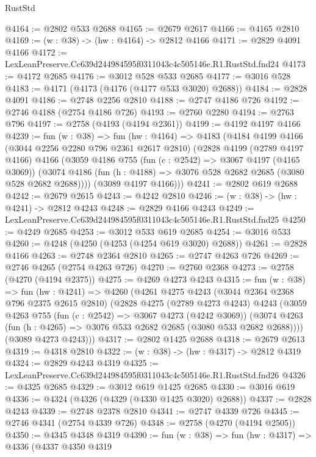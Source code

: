 \begin{lexlean}{RustStd}
\begin{coremodule}
@4164 := @2802 @533 @2688
@4165 := @2679 @2617
@4166 := @4165 @2810
@4169 := (w : @38) -> (hw : @4164) -> @2812 @4166
@4171 := @2829 @4091 @4166
@4172 := LexLeanPreserve.Cc639d244984595f0311043c4c505146e.R1.RustStd.fnd24
@4173 := @4172 @2685
@4176 := @3012 @528 @533 @2685
@4177 := @3016 @528
@4183 := @4171 (@4173 (@4176 (@4177 @533 @3020) @2688))
@4184 := @2828 @4091
@4186 := @2748 @2256 @2810
@4188 := @2747 @4186 @726
@4192 := @2746 @4188 (@2754 @4186 @726)
@4193 := @2760 @2280
@4194 := @2763 @796
@4197 := @2758 (@4193 (@4194 @2361))
@4199 := @4192 @4197 @4166
@4239 := fun (w : @38) =>
  fun (hw : @4164) =>
  @4183
    (@4184
      @4199
      @4166
      (@3044 @2256 @2280 @796 @2361 @2617 @2810)
      (@2828
        @4199
        (@2789 @4197 @4166)
        @4166
        (@3059
          @4186
          @755
          (fun (c : @2542) => @3067 @4197 (@4165 @3069))
          (@3074 @4186 (fun (h : @4188) => @3076 @528 @2682 @2685 (@3080 @528 @2682 @2688))))
        (@3089 @4197 @4166)))
@4241 := @2802 @619 @2688
@4242 := @2679 @2615
@4243 := @4242 @2810
@4246 := (w : @38) -> (hw : @4241) -> @2812 @4243
@4248 := @2829 @4166 @4243
@4249 := LexLeanPreserve.Cc639d244984595f0311043c4c505146e.R1.RustStd.fnd25
@4250 := @4249 @2685
@4253 := @3012 @533 @619 @2685
@4254 := @3016 @533
@4260 := @4248 (@4250 (@4253 (@4254 @619 @3020) @2688))
@4261 := @2828 @4166
@4263 := @2748 @2364 @2810
@4265 := @2747 @4263 @726
@4269 := @2746 @4265 (@2754 @4263 @726)
@4270 := @2760 @2368
@4273 := @2758 (@4270 (@4194 @2375))
@4275 := @4269 @4273 @4243
@4315 := fun (w : @38) =>
  fun (hw : @4241) =>
  @4260
    (@4261
      @4275
      @4243
      (@3044 @2364 @2368 @796 @2375 @2615 @2810)
      (@2828
        @4275
        (@2789 @4273 @4243)
        @4243
        (@3059
          @4263
          @755
          (fun (c : @2542) => @3067 @4273 (@4242 @3069))
          (@3074 @4263 (fun (h : @4265) => @3076 @533 @2682 @2685 (@3080 @533 @2682 @2688))))
        (@3089 @4273 @4243)))
@4317 := @2802 @1425 @2688
@4318 := @2679 @2613
@4319 := @4318 @2810
@4322 := (w : @38) -> (hw : @4317) -> @2812 @4319
@4324 := @2829 @4243 @4319
@4325 := LexLeanPreserve.Cc639d244984595f0311043c4c505146e.R1.RustStd.fnd26
@4326 := @4325 @2685
@4329 := @3012 @619 @1425 @2685
@4330 := @3016 @619
@4336 := @4324 (@4326 (@4329 (@4330 @1425 @3020) @2688))
@4337 := @2828 @4243
@4339 := @2748 @2378 @2810
@4341 := @2747 @4339 @726
@4345 := @2746 @4341 (@2754 @4339 @726)
@4348 := @2758 (@4270 (@4194 @2505))
@4350 := @4345 @4348 @4319
@4390 := fun (w : @38) =>
  fun (hw : @4317) =>
  @4336
    (@4337
      @4350
      @4319

\end{coremodule}
\end{lexlean}
